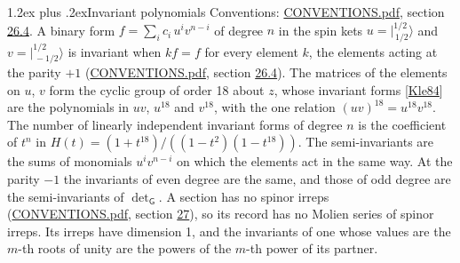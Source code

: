 \documentclass[10pt,a4paper]{article}
\makeatletter
\renewcommand\section{\@startsection{section}{1}{\z@}{-3ex plus -1ex minus -.2ex}%
  {1.2ex plus .2ex}{\normalfont\large\sffamily\bfseries\color{parttitle}}}
\numberwithin{equation}{section}
\newcommand{\grp}[1]{\mathsf{#1}}
\newcommand{\jm}[2]{\bigl\lvert{}^{#1}_{\,#2}\bigr\rangle}
\makeatother
\begin{document}
\section{Invariant polynomials}\label{s:invariants}
Conventions: \href{../../CONVENTIONS.pdf}{CONVENTIONS.pdf}, section \href{../../CONVENTIONS.pdf\#conv.26.4}{26.4}.
\leavevmode\label{n:local.spinor.uv}\label{n:local.binary.form}A binary form $f = \sum_i c_i\, u^i v^{n-i}$ of degree $n$ in the spin kets $u = \jm{1/2}{1/2}$ and $v = \jm{1/2}{-1/2}$ is invariant when $k f = f$ for every element $k$, the elements acting at the parity $+1$ (\href{../../CONVENTIONS.pdf}{CONVENTIONS.pdf}, section \href{../../CONVENTIONS.pdf\#conv.26.4}{26.4}).
The matrices of the elements on $u$, $v$ form the cyclic group of order 18 about $z$, whose invariant forms [\href{../../../REFERENCES.pdf\#ref.Kle84}{Kle84}] are the polynomials in $uv$, $u^{18}$ and $v^{18}$, with the one relation $(uv)^{18} = u^{18}v^{18}$. \label{n:function.hilbert}The number of linearly independent invariant forms of degree $n$ is the coefficient of $t^n$ in $H(t) = (1 + t^{18})/((1-t^{2})(1-t^{18}))$. The semi-invariants are the sums of monomials $u^i v^{n-i}$ on which the elements act in the same way. At the parity $-1$ the invariants of even degree are the same, and those of odd degree are the semi-invariants of $\det_{\grp{G}}$. A section has no spinor irreps (\href{../../CONVENTIONS.pdf}{CONVENTIONS.pdf}, section \href{../../CONVENTIONS.pdf\#conv.27}{27}), so its record has no Molien series of spinor irreps. Its irreps have dimension 1, and the invariants of one whose values are the $m$-th roots of unity are the powers of the $m$-th power of its partner.
\end{document}
